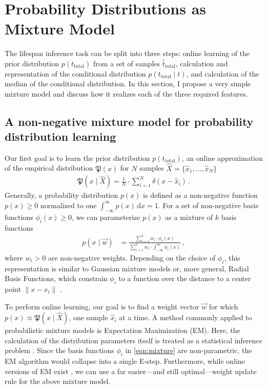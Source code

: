 \documentclass[a4paper,11pt]{article}
\begin{document}
\pagebreak
\section{Probability Distributions as Mixture Model}
\label{sec:pdist_mixture_model}

The lifespan inference task can be split into three steps: online learning of the prior distribution $p(t_\mathrm{total})$ from a set of samples $\hat t_\mathrm{total}$, calculation and representation of the conditional distribution $p(t_\mathrm{total} \mid t)$, and calculation of the median of the conditional distribution. In this section, I propose a very simple mixture model and discuss how it realizes each of the three required features.

\subsection{A non-negative mixture model for probability distribution learning}
\label{sec:mixture_model}

Our first goal is to learn the prior distribution $p(t_\mathrm{total})$, an online approximation of the empirical distribution $\mathfrak{P}(x)$ for $N$ samples $\hat X = \{\hat x_1, \ldots, \hat x_N\}$
\begin{align}
	\mathfrak{P}(x \mid \hat X) = \frac{1}N \cdot \sum_{i=1}^N \delta(x - \hat x_i) \,.
	\label{eqn:empirical_distr}
\end{align}
Generally, a probability distribution $p(x)$ is defined as a non-negative function $p(x) \geq 0$ normalized to one $\int_{-\infty}^{\infty} p(x) \,\mathrm{d}x = 1$. For a set of non-negative basis functions $\phi_i(x) \geq 0$, we can parameterize $p(x)$ as a mixture of $k$ basis functions
\begin{align}
	 p(x \mid \vec w) &= \frac{\sum_{i=1}^k w_i \cdot \phi_i(x)}{\sum_{i=1}^k w_i \cdot \int_{-\infty}^\infty \phi_i(x)} \,,
	 \label{eqn:mixture}
\end{align}
where $w_i > 0$ are non-negative weights. Depending on the choice of $\phi_i$, this representation is similar to Gaussian mixture models or, more general, Radial Basis Functions, which constrain $\phi_i$ to a function over the distance to a center point $\|x - x_i\|$ \cite{press2007numerical}.

To perform online learning, our goal is to find a weight vector $\vec w$ for which $p(x) \approx \mathfrak{P}(x \mid \hat X)$, one sample $\hat x_i$ at a time. A method commonly applied to probabilistic mixture models is Expectation Maximization (EM). Here, the calculation of the distribution parameters itself is treated as a statistical inference problem \cite{dempster1977maximum}. Since the basis functions $\phi_i$ in \cref{eqn:mixture} are non-parametric, the EM algorithm would collapse into a single E-step. Furthermore, while online versions of EM exist \cite{titterington1984recursive,cappe2009online}, we can use a far easier---and still optimal---weight update rule for the above mixture model.
\end{document}
